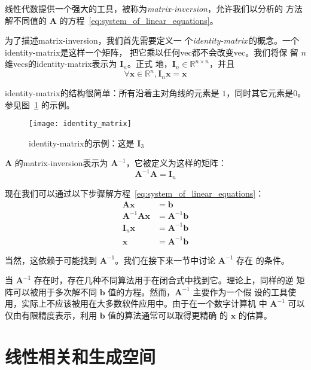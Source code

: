 线性代数提供一个强大的工具，被称为\emph{\gls{matrix-inversion}}，允许我们以分析的
方法解不同值的 $\pmb{A}$ 的方程~\ref{eq:system_of_linear_equations}。

为了描述\gls*{matrix-inversion}，我们首先需要定义一
个\emph{\gls{identity-matrix}}\,的概念。一个\gls*{identity-matrix}是这样一个矩阵，
把它乘以任何\gls*{vec}都不会改变\gls*{vec}。我们将保
留 $n$ 维\gls*{vecs}的\gls*{identity-matrix}表示为 $\pmb{I}_n$。正式
地，$\pmb{I}_n \in \mathbb{R}^{n \times n}$，并且
\begin{equation}
  \forall \pmb{x} \in \mathbb{R}^n, \pmb{I}_n\pmb{x} = \pmb{x}
  \label{eq:definition_of_identity_matrix}
\end{equation}

\gls*{identity-matrix}的结构很简单：所有沿着主对角线的元素是
$1$，同时其它元素是$0$。参见图~\ref{fig:identity_matrix} 的示例。

\begin{figure}[h]
  \centering
  \texttt{[image: identity\_matrix]}
  \caption{\gls*{identity-matrix}的示例：这是
    $\pmb{I}_3$\label{fig:identity_matrix}}
\end{figure}

$\pmb{A}$ 的\gls*{matrix-inversion}表示为 $\pmb{A}^{-1}$，它被定义为这样的矩阵：
\begin{equation}
  \pmb{A}^{-1}\pmb{A} = \pmb{I}_n
  \label{eq:matrix-inverse}
\end{equation}

现在我们可以通过以下步骤解方程~\ref{eq:system_of_linear_equations}：
\begin{align}
  \pmb{A}\pmb{x} &= \pmb{b} \\
  \pmb{A}^{-1}\pmb{A}\pmb{x} &= \pmb{A}^{-1}\pmb{b} \\
  \pmb{I}_n\pmb{x} &= \pmb{A}^{-1}\pmb{b} \\
  \pmb{x} &= \pmb{A}^{-1}\pmb{b}
\end{align}

当然，这依赖于可能找到 $\pmb{A}^{-1}$。我们在接下来一节中讨论 $\pmb{A}^{-1}$ 存在
的条件。

当 $\pmb{A}^{-1}$ 存在时，存在几种不同算法用于在闭合式中找到它。理论上，同样的逆
矩阵可以被用于多次解不同 $\pmb{b}$ 值的方程。然而，$\pmb{A}^{-1}$ 主要作为一个假
设的工具使用，实际上不应该被用在大多数软件应用中。由于在一个数字计算机
中 $\pmb{A}^{-1}$ 可以仅由有限精度表示，利用 $\pmb{b}$ 值的算法通常可以取得更精确
的 $\pmb{x}$ 的估算。

\section{线性相关和生成空间}
\label{sec:linear_dependence_and_span}

